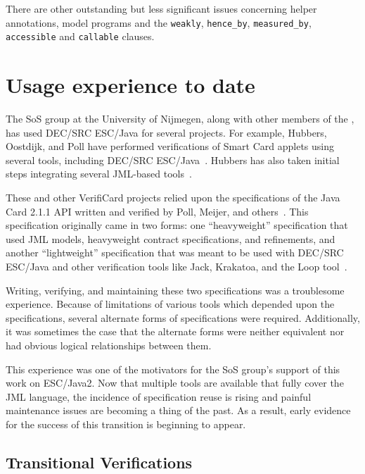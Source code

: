 \documentclass{llncs}
\begin{document}
There are other outstanding but less significant issues concerning
helper annotations, model programs and the \texttt{weakly},
\texttt{hence\_by}, \texttt{measured\_by}, \texttt{accessible} and
\texttt{callable} clauses.

\section{Usage experience to date}
\label{sec:usage-exper-date}
The SoS group at the University of Nijmegen, along with other members
of the , has used DEC/SRC ESC/Java for
several projects.  For example, Hubbers, Oostdijk, and Poll have
performed verifications of Smart Card applets using several tools,
including DEC/SRC ESC/Java~\cite{HOP04}.  Hubbers has also taken
initial steps integrating several JML-based tools~\cite{Hub03}.

These and other VerifiCard projects relied upon the specifications of
the Java Card 2.1.1 API written and verified by Poll, Meijer, and
others~\cite{MeijerPoll01}.  This specification originally came in two
forms: one ``heavyweight'' specification that used JML models,
heavyweight contract specifications, and refinements, and another
``lightweight'' specification that was meant to be used with DEC/SRC
ESC/Java and other verification tools like Jack, Krakatoa, and the
Loop tool~\cite{BergJ01,BurdyRequet02,MarchePaulinMohringUrbain04}.

Writing, verifying, and maintaining these two specifications was a
troublesome experience.  Because of limitations of various tools which
depended upon the specifications, several alternate forms of
specifications were required.  Additionally, it was sometimes the case
that the alternate forms were neither equivalent nor had obvious
logical relationships between them.

This experience was one of the motivators for the SoS group's support
of this work on ESC/Java2.  Now that multiple tools are available that
fully cover the JML language, the incidence of specification reuse is
rising and painful maintenance issues are becoming a thing of the
past.  As a result, early evidence for the success of this transition
is beginning to appear.

\subsection{Transitional Verifications}
\end{document}
